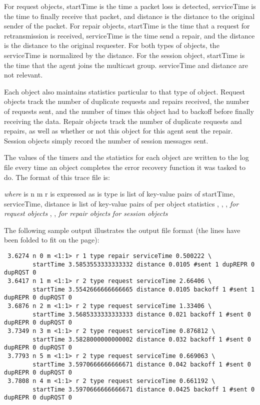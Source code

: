 For request objects, startTime is the time a packet loss is detected,
serviceTime is the time to finally receive that packet,
and distance is the distance to the original sender of the packet.
For repair objects, startTime is the time that a request for
retransmission is received, serviceTime is the time send a repair,
and the distance is the distance to the original requester.
For both types of objects, the serviceTime is normalized by the
distance.
For  the session object,
startTime is the time that the agent joins the multicast group.
serviceTime and distance are not relevant.

Each object also maintains statistics particular to that type of object.
Request objects track the number of duplicate requests and repairs received,
the number of requests sent, and the number of times this object
had to backoff before finally receiving the data.
Repair objects track the number of duplicate requests and repairs,
as well as whether or not this object for this agent sent the repair.
Session objects simply record the number of session messages sent.

The values of the timers and the statistics for each object are written
to the log file every time an object completes the error recovery function
it was tasked to do.
The format of this trace file is:
\begin{program}
                   
{\itshape{}where}
 is          n  m  r 
                 is expressed as 
 is             type 
 is          list of key-value pairs of startTime, serviceTime, distance
 is          list of key-value pairs of per object statistics
                , , ,              {\itshape for request objects}
                , ,                       {\itshape for repair objects}
                                                        {\itshape for session objects}
\end{program}
The following sample output illustrates the output file format (the lines
have been folded to fit on the page):
{\small
\begin{verbatim}
 3.6274 n 0 m <1:1> r 1 type repair serviceTime 0.500222 \
        startTime 3.5853553333333332 distance 0.0105 #sent 1 dupREPR 0 dupRQST 0
 3.6417 n 1 m <1:1> r 2 type request serviceTime 2.66406 \
        startTime 3.5542666666666665 distance 0.0105 backoff 1 #sent 1 dupREPR 0 dupRQST 0
 3.6876 n 2 m <1:1> r 2 type request serviceTime 1.33406 \
        startTime 3.5685333333333333 distance 0.021 backoff 1 #sent 0 dupREPR 0 dupRQST 0
 3.7349 n 3 m <1:1> r 2 type request serviceTime 0.876812 \
        startTime 3.5828000000000002 distance 0.032 backoff 1 #sent 0 dupREPR 0 dupRQST 0
 3.7793 n 5 m <1:1> r 2 type request serviceTime 0.669063 \
        startTime 3.5970666666666671 distance 0.042 backoff 1 #sent 0 dupREPR 0 dupRQST 0
 3.7808 n 4 m <1:1> r 2 type request serviceTime 0.661192 \
        startTime 3.5970666666666671 distance 0.0425 backoff 1 #sent 0 dupREPR 0 dupRQST 0
\end{verbatim}
}


